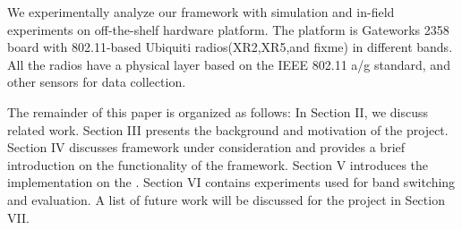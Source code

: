 We experimentally analyze our framework with simulation and in-field experiments on off-the-shelf hardware platform. The platform is Gateworks 2358 board with 802.11-based Ubiquiti radios(XR2,XR5,and fixme) in different bands. All the radios have a physical layer based on the IEEE 802.11 a/g standard, and other sensors for data collection.

The remainder of this paper is organized as follows: In Section II, we discuss related work. Section III presents the background and motivation of the project.  Section IV discusses framework under consideration and provides a brief introduction on the functionality of the framework. 
Section V introduces the implementation on the . Section VI contains experiments used for band switching and evaluation.  A list of future work will be discussed for the project in Section VII.


